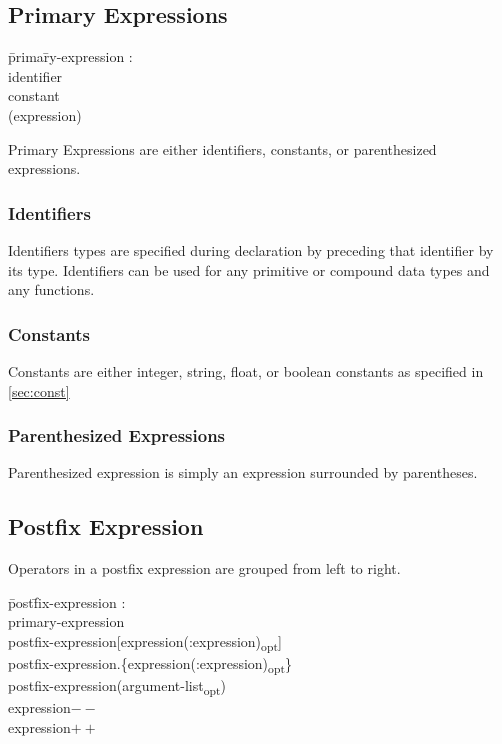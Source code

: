 \documentclass{article}
\begin{document}
\subsection{Primary Expressions}
\begin{itshape}
\begin{tabbing}
	\= prima\=ry-expression : \\
		\>\> identifier \\
		\>\> constant \\ 
		\>\> (expression)
\end{tabbing}
\end{itshape}
Primary Expressions are either identifiers, constants, or parenthesized expressions. 
\subsubsection{Identifiers}
Identifiers types are specified during declaration by preceding that identifier by its type.  Identifiers can be used for any primitive or compound data types and any functions. 
\subsubsection{Constants}
Constants are either integer, string, float, or boolean constants as specified in \ref{sec:const}
\subsubsection{Parenthesized Expressions}
Parenthesized expression is simply an expression surrounded by parentheses. 

\subsection{Postfix Expression}
Operators in a postfix expression are grouped from left to right.
\begin{itshape}
\begin{tabbing}
	\= post\=fix-expression : \\
		\> \> primary-expression \\
		\>\> postfix-expression[expression(:expression)\textsubscript{opt}] \\		
		\>\> postfix-expression.\{expression(:expression)\textsubscript{opt}\}\\
		\>\> postfix-expression(argument-list\textsubscript{opt}) \\ 
		\> \> expression$--$ \\
		\> \> expression$++$ 
\end{tabbing}
\end{itshape}
\end{document}
